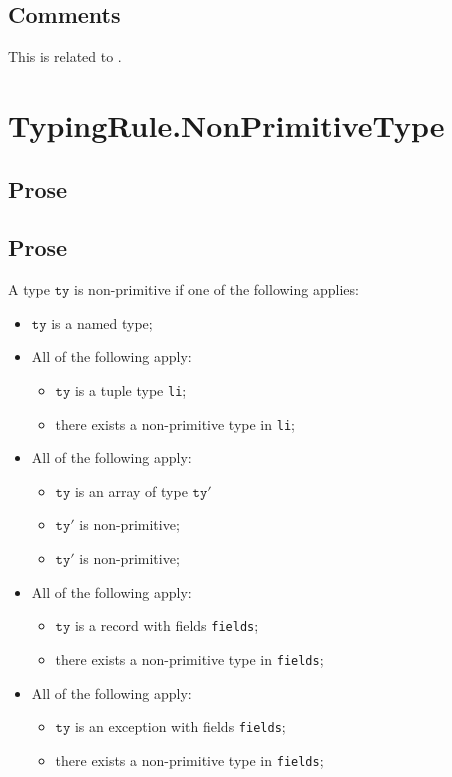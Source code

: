 \documentclass{book}
\newcommand\tty[0]{\texttt{ty}}
\begin{document}
    \subsection{Comments}
    This is related to .

\newcommand\vtp[0]{\texttt{t}'}

\section{TypingRule.NonPrimitiveType}

    \subsection{Prose}
    \subsection{Prose}
    A type $\tty$ is non-primitive if one of the following applies:
    \begin{itemize}
    \item $\tty$ is a named type;
    \item All of the following apply:
      \begin{itemize}
      \item $\tty$ is a tuple type \texttt{li};
      \item there exists a non-primitive type in \texttt{li};
      \end{itemize}
    \item All of the following apply:
      \begin{itemize}
      \item $\tty$ is an array of type $\tty'$
      \item $\tty'$ is non-primitive;
      \item $\tty'$ is non-primitive;
      \end{itemize}
    \item All of the following apply:
      \begin{itemize}
      \item $\tty$ is a record with fields \texttt{fields};
      \item there exists a non-primitive type in \texttt{fields};
      \end{itemize}
    \item All of the following apply:
      \begin{itemize}
      \item $\tty$ is an exception with fields \texttt{fields};
      \item there exists a non-primitive type in \texttt{fields};
      \end{itemize}
    \end{itemize}
\end{document}
